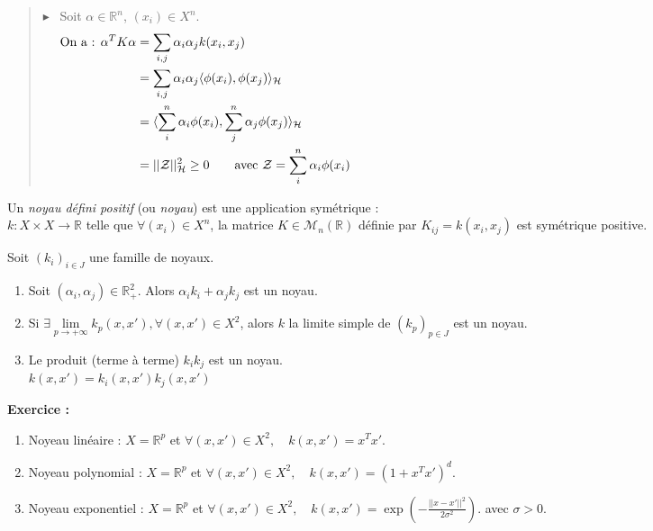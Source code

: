 \documentclass[12pt,a4paper]{article}
\newcommand{\propriete}[2]{%
    \begin{tcolorbox}[colback=white,colframe=green!25!white,title=\textbf{Propriété #1}, coltitle=black]
        #2
    \end{tcolorbox}
}
\newcommand{\definition}[2]{%
    \begin{tcolorbox}[colback=white,colframe=blue!25!white,title=\textbf{Définition #1}, coltitle=black]
        #2
    \end{tcolorbox}
}
\newcommand{\preuve}[1]{%
    \begin{quote}
        $\blacktriangleright$~#1
    \end{quote}
}
\begin{document}
\preuve{
    Soit $\alpha \in \mathbb{R}^n$, $(x_i) \in X^n$. \\
    \begin{align*}
        \text{On a : } 
        \alpha^T K \alpha & = \sum_{i, j} \alpha_i \alpha_j k(x_i, x_j) \hspace{14.5cm} \\
        & = \sum_{i, j} \alpha_i \alpha_j \langle \phi(x_i), \phi(x_j) \rangle_{\mathcal{H}} \\
        & = \langle \sum_i^n \alpha_i \phi(x_i), \sum_j^n \alpha_j \phi(x_j) \rangle_{\mathcal{H}} \\
        & = ||\mathcal{Z}||^2_{\mathcal{H}} \geq 0 \qquad \text{avec } \mathcal{Z} = \sum_i^n \alpha_i \phi(x_i)
    \end{align*}  
}

\definition{}{
    Un \textit{noyau défini positif} (ou \textit{noyau}) est une application symétrique : \\
    $k : X \times X \longrightarrow \mathbb{R}$ telle que $\forall (x_i) \in X^n$, la matrice $K \in \mathcal{M}_n(\mathbb{R})$ définie par $K_{ij} = k(x_i, x_j)$ est symétrique positive.
}

\propriete{}{
    Soit $(k_i)_{i \in J}$ une famille de noyaux.
    \begin{enumerate}[label=\roman*)]
        \item Soit $(\alpha_i, \alpha_j) \in \mathbb{R}^2_+$. Alors $\alpha_i k_i + \alpha_j k_j$ est un noyau.
        \item Si $\exists \underset{p \rightarrow +\infty}{\lim} k_p(x, x'), \forall (x, x') \in X^2$, alors $k$ la limite simple de $(k_p)_{p \in J}$ est un noyau.
        \item Le produit (terme à terme) $k_i k_j$ est un noyau. \\
        $k(x, x') = k_i(x, x') k_j(x, x')$
    \end{enumerate}
}

\textbf{Exercice :}
\begin{enumerate}
    \item Noyeau linéaire : $X = \mathbb{R}^p$ et $\forall (x, x') \in X^2, \quad k(x, x') = x^T x'$.
    \item Noyeau polynomial : $X = \mathbb{R}^p$ et $\forall (x, x') \in X^2, \quad k(x, x') = (1 + x^T x')^d$.
    \item Noyeau exponentiel : $X = \mathbb{R}^p$ et $\forall (x, x') \in X^2, \quad k(x, x') = \exp(-\frac{||x - x'||^2}{2\sigma^2})$. avec $\sigma > 0$.
\end{enumerate}
\end{document}

